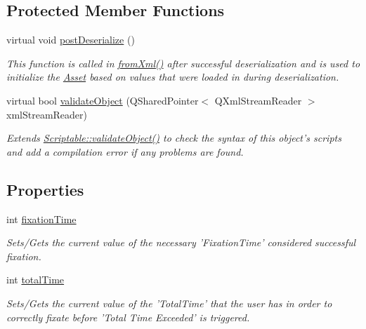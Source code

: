 \subsection*{Protected Member Functions}
\begin{DoxyCompactItemize}
\item 
virtual void \hyperlink{class_picto_1_1_choice_controller_a98308dba448abcbb46044533a3e6a56a}{post\-Deserialize} ()
\begin{DoxyCompactList}\small\item\em This function is called in \hyperlink{class_picto_1_1_asset_a8bed4da09ecb1c07ce0dab313a9aba67}{from\-Xml()} after successful deserialization and is used to initialize the \hyperlink{class_picto_1_1_asset}{Asset} based on values that were loaded in during deserialization. \end{DoxyCompactList}\item 
\hypertarget{class_picto_1_1_choice_controller_a56c6ea768c91091c2f76b80d026c6c83}{virtual bool \hyperlink{class_picto_1_1_choice_controller_a56c6ea768c91091c2f76b80d026c6c83}{validate\-Object} (Q\-Shared\-Pointer$<$ Q\-Xml\-Stream\-Reader $>$ xml\-Stream\-Reader)}\label{class_picto_1_1_choice_controller_a56c6ea768c91091c2f76b80d026c6c83}

\begin{DoxyCompactList}\small\item\em Extends \hyperlink{class_picto_1_1_scriptable_ab6e2944c43a3b5d418bf7b251594386d}{Scriptable\-::validate\-Object()} to check the syntax of this object's scripts and add a compilation error if any problems are found. \end{DoxyCompactList}\end{DoxyCompactItemize}
\subsection*{Properties}
\begin{DoxyCompactItemize}
\item 
\hypertarget{class_picto_1_1_choice_controller_af2d0b748ae22b5177166c32570657fe4}{int \hyperlink{class_picto_1_1_choice_controller_af2d0b748ae22b5177166c32570657fe4}{fixation\-Time}}\label{class_picto_1_1_choice_controller_af2d0b748ae22b5177166c32570657fe4}

\begin{DoxyCompactList}\small\item\em Sets/\-Gets the current value of the necessary 'Fixation\-Time' considered successful fixation. \end{DoxyCompactList}\item 
\hypertarget{class_picto_1_1_choice_controller_ab077166f788eb2c25d6bb059361c6ff6}{int \hyperlink{class_picto_1_1_choice_controller_ab077166f788eb2c25d6bb059361c6ff6}{total\-Time}}\label{class_picto_1_1_choice_controller_ab077166f788eb2c25d6bb059361c6ff6}

\begin{DoxyCompactList}\small\item\em Sets/\-Gets the current value of the 'Total\-Time' that the user has in order to correctly fixate before 'Total Time Exceeded' is triggered. \end{DoxyCompactList}\end{DoxyCompactItemize}

